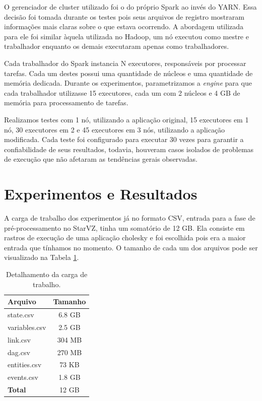 O gerenciador de cluster utilizado foi o do próprio Spark ao invés do YARN. 
Essa decisão foi tomada durante os testes pois seus arquivos de registro 
mostraram informações mais claras sobre o que estava ocorrendo. A abordagem 
utilizada para ele foi similar àquela utilizada no Hadoop, um nó executou 
como mestre e trabalhador enquanto os demais executaram apenas como 
trabalhadores. 

Cada trabalhador do Spark instancia N executores, responsáveis 
por processar tarefas. Cada um destes possui uma quantidade de núcleos e uma 
quantidade de memória dedicada. Durante os experimentos, parametrizamos a 
\textit{engine} para que cada trabalhador utilizasse 15 executores, cada um com 
2 núcleos e 4 GB de memória para processamento de tarefas.

Realizamos testes com 1 nó, utilizando a aplicação original, 15 executores em 1 
nó, 30 executores em 2 e 45 executores em 3 nós, utilizando a aplicação 
modificada. Cada teste foi configurado para executar 30 vezes para garantir a 
confiabilidade de seus resultados, todavia, houveram casos isolados de problemas 
de execução que não afetaram as tendências gerais observadas.


\section{Experimentos e Resultados} \label{sect:results}

A carga de trabalho dos experimentos já no formato CSV, entrada para a fase de 
pré-processamento no StarVZ, tinha um somatório de 12 GB. Ela consiste em 
rastros de execução de uma aplicação cholesky e foi escolhida pois era a maior
entrada que tínhamos no momento. O tamanho de cada um dos arquivos pode ser 
visualizado na Tabela \ref{tab:input_sz}.

\begin{table}[H]
\centering
\small
\begin{tabular}{l c} \toprule
\textbf{Arquivo}  &  \textbf{Tamanho} \\ 
\midrule
state.csv	& 6.8 GB \\
variables.csv  	& 2.5 GB \\
link.csv       	& 304 MB \\
dag.csv        	& 270 MB \\
entities.csv	& 73 KB \\
events.csv	& 1.8 GB \\
\textbf{Total}  & 12 GB  \\
\end{tabular}
\caption{Detalhamento da carga de trabalho.}
\label{tab:input_sz}
\end{table}

